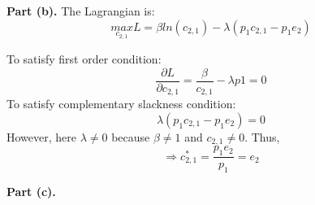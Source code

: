 \documentclass[letterpaper,12pt]{article}
\theoremstyle{definition}
\begin{document}
\textbf{Part (b).} The Lagrangian is:
\begin{equation*}
	\underset{c_{2,1}}{max}
   L= \beta ln(c_{2,1})-\lambda (p_1 c_{2,1} - p_1 e_2)
\end{equation*}

To satisfy first order condition:
\begin{equation*} 
\frac{\partial L}{\partial c_{2,1}} = \frac{\beta}{c_{2,1}}-\lambda p1 = 0
\end{equation*}
To satisfy complementary slackness condition:
\begin{equation*}
\lambda (p_1 c_{2,1}-p_1 e_2) = 0
\end {equation*}
However, here $\lambda \neq 0$ because $\beta \neq 1$ and $c_{2,1} \neq 0$. Thus,
\begin{equation*} 
\Rightarrow c_{2,1}^*=\frac{p_1 e_2}{p_1} = e_2
\end{equation*}

\textbf{Part (c).} 
\end{document}
